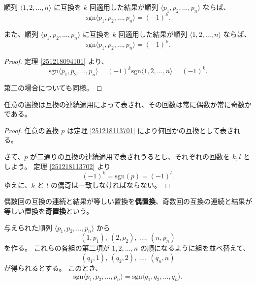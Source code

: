 \begin{thm}\label{251218113702}
  順列 \(\langle 1,2,\ldots,n\rangle\) に互換を \(k\) 回適用した結果が順列 \(\langle p_1,p_2,\ldots,p_n\rangle\) ならば、
  \[\mathrm{sgn}\langle p_1,p_2,\ldots,p_n\rangle=(-1)^k.\]

  また、順列 \(\langle p_1,p_2,\ldots,p_n\rangle\) に互換を \(k\) 回適用した結果が順列 \(\langle 1,2,\ldots,n\rangle\) ならば、
  \[\mathrm{sgn}\langle p_1,p_2,\ldots,p_n\rangle=(-1)^k.\]
\end{thm}

\begin{proof}
  定理 \ref{251218094101} より、
  \[\mathrm{sgn}\langle p_1,p_2,\ldots,p_n\rangle=(-1)^k\mathrm{sgn}\langle 1,2,\ldots,n\rangle=(-1)^k.\]

  第二の場合についても同様。
\end{proof}

\begin{thm}
  任意の置換は互換の連続適用によって表され、その回数は常に偶数か常に奇数かである。
\end{thm}

\begin{proof}
  任意の置換 \(p\) は定理 \ref{251218113701} により何回かの互換として表される。

  さて、\(p\) が二通りの互換の連続適用で表されうるとし、それぞれの回数を \(k,l\) としよう。
  定理 \ref{251218113702} より
  \[(-1)^k=\mathrm{sgn}(p)=(-1)^l.\]
  ゆえに、\(k\) と \(l\) の偶奇は一致しなければならない。
\end{proof}

\begin{dfn}
  偶数回の互換の連続と結果が等しい置換を\textbf{偶置換}、奇数回の互換の連続と結果が等しい置換を\textbf{奇置換}という。
\end{dfn}

\begin{thm}\label{251218233301}
  与えられた順列 \(\langle p_1,p_2,\ldots,p_n\rangle\) から
  \begin{equation}\label{251218110201}
    (1,p_1),\ (2,p_2),\ \ldots,\ (n,p_n)
  \end{equation}
  を作る。
  これらの各組の第二項が \(1,2,\ldots,n\) の順になるように組を並べ替えて、
  \begin{equation}\label{251218110202}
    (q_1,1),\ (q_2,2),\ \ldots,\ (q_n,n)
  \end{equation}
  が得られるとする。
  このとき、
  \[\mathrm{sgn}\langle p_1,p_2,\ldots,p_n\rangle=\mathrm{sgn}\langle q_1,q_2,\ldots,q_n\rangle.\]
\end{thm}

